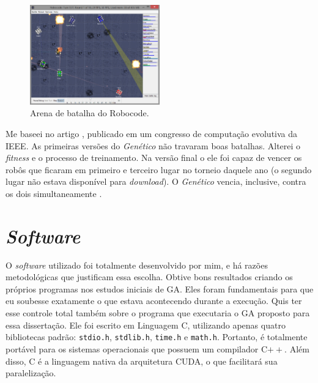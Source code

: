 	\begin{figure}[htbp]
		\centering
			\includegraphics[width=0.50\textwidth]{figs/materiais_metodo/ga/Robocode_Battle_Field.PNG}
		\caption{Arena de batalha do Robocode.}
		\label{fig:Robocode}
	\end{figure}
	
	Me baseei no artigo \cite{robocodeGA}, publicado em um congresso de computação evolutiva da IEEE. As primeiras versões do \emph{Genético} não travaram boas batalhas. Alterei o \emph{fitness} e o processo de treinamento. Na versão final o ele foi capaz de vencer os robôs que ficaram em primeiro e terceiro lugar no torneio daquele ano (o segundo lugar não estava disponível para \emph{download}). O \emph{Genético} vencia, inclusive, contra os dois simultaneamente \cite{robocodeGA_adriano}.
	

\section{\emph{Software}}

	O \emph{software} utilizado foi totalmente desenvolvido por mim, e há razões metodológicas que justificam essa escolha. Obtive bons resultados criando os próprios programas nos estudos iniciais de GA. Eles foram fundamentais para que eu soubesse exatamente o que estava acontecendo durante a execução. Quis ter esse controle total também sobre o programa que executaria o GA proposto para essa dissertação. Ele foi escrito em Linguagem C, utilizando apenas quatro bibliotecas padrão: \texttt{stdio.h}, \texttt{stdlib.h}, \texttt{time.h} e \texttt{math.h}. Portanto, é totalmente portável para os sistemas operacionais que possuem um compilador C$++$. Além disso, C é a linguagem nativa da arquitetura CUDA, o que facilitará sua paralelização.
	
